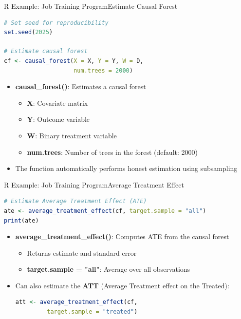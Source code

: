 \documentclass[dvipsnames,hyperref={pdfpagelabels=false}]{beamer}
\begin{document}
\begin{frame}[fragile]{R Example: Job Training Program}{Estimate Causal Forest}
\begin{lstlisting}[language=R]
# Set seed for reproducibility
set.seed(2025)

# Estimate causal forest
cf <- causal_forest(X = X, Y = Y, W = D,
                    num.trees = 2000)
\end{lstlisting}
	\begin{itemize}
		\item \textbf{causal\_forest()}: Estimates a causal forest
		\vspace{0.2cm}
		\begin{itemize}
			\item \textbf{X}: Covariate matrix
			\vspace{0.2cm}
			\item \textbf{Y}: Outcome variable
			\vspace{0.2cm}
			\item \textbf{W}: Binary treatment variable
			\vspace{0.2cm}
			\item \textbf{num.trees}: Number of trees in the forest (default: 2000)
		\end{itemize}
		\vspace{0.2cm}
		\item The function automatically performs honest estimation using subsampling
	\end{itemize}
\end{frame}




\begin{frame}[fragile]{R Example: Job Training Program}{Average Treatment Effect}
\begin{lstlisting}[language=R]
# Estimate Average Treatment Effect (ATE)
ate <- average_treatment_effect(cf, target.sample = "all")
print(ate)
\end{lstlisting}
	\begin{itemize}
		\item \textbf{average\_treatment\_effect()}: Computes ATE from the causal forest
		\vspace{0.2cm}
		\begin{itemize}
			\item Returns estimate and standard error
			\vspace{0.2cm}
			\item \textbf{target.sample = "all"}: Average over all observations
		\end{itemize}
		\vspace{0.3cm}
		\item Can also estimate the \textbf{ATT} (Average Treatment effect on the Treated):
\begin{lstlisting}[language=R]
att <- average_treatment_effect(cf,
         target.sample = "treated")
\end{lstlisting}
	\end{itemize}
\end{frame}
\end{document}
